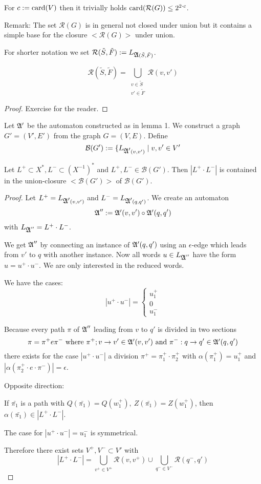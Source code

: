 For $c := \mathrm{card}(V)$ then it trivially holds $\mathrm{card}(\mathcal{R}(G)) \leq 2^{2
\cdot c}$.

Remark: The set $\mathcal{R}(G)$ is in general not closed under union but it
contains a simple base for the closure $<\mathcal{R}(G)>$ under union.

For shorter notation we set $\mathcal{R}(\tilde{S},\tilde{F}) :=
L_{\mbox{$\mathfrak{A}$}(\tilde{S},\tilde{F})}$.

\begin{lemma}
\[ \mathcal{R}(\tilde{S},\tilde{F}) = \bigcup_{\substack{v \in \tilde{S}\\v'
\in \tilde{F}}} \mathcal{R}(v, v') \]
\end{lemma}

\begin{proof}
Exercise for the reader.
\end{proof}

Let $\mbox{$\mathfrak{A'}$}$ be the automaton constructed as in lemma 1. We construct a graph
$G' = (V', E')$ from the graph $G = (V, E)$. Define
\[ \mathcal{B}(G') := \{ L_{\mbox{$\mathfrak{A'}$}(v, v')} \mid v, v' \in V' \]

\begin{lemma}
Let $L^+ \subset X^*, L^- \subset (X^{-1})^*$ and $L^+, L^- \in
\mathcal{B}(G')$. Then $|L^+ \cdot L^-|$ is contained in the union-closure
$<\mathcal{B}(G')>$ of $\mathcal{B}(G')$.
\end{lemma}

\begin{proof}
Let $L^+ = L_{\mbox{$\mathfrak{A'}$}(v, v')}$ and $L^- = L_{\mbox{$\mathfrak{A'}$}(q, q')}$. We create an
automaton
\[ \mbox{$\mathfrak{A}$}'' := \mbox{$\mathfrak{A'}$}(v, v') \circ \mbox{$\mathfrak{A'}$}(q, q') \]
with $L_{\mbox{$\mathfrak{A}$}''} = L^+ \cdot L^-$.

We get $\mbox{$\mathfrak{A}$}''$ by connecting an instance of $\mbox{$\mathfrak{A'}$}(q, q')$ using an
$\epsilon$-edge which leads from $v'$ to $q$ with another instance. Now all
words $u \in L_{\mbox{$\mathfrak{A}$}''}$ have the form $u = u^+ \cdot u^-$. We are only
interested in the reduced words.

We have the cases:
\[ |u^+ \cdot u^-| = \begin{cases} u_1^+ \\ 0 \\ u_1^- \end{cases} \]

Because every path $\pi$ of $\mbox{$\mathfrak{A}$}''$ leading from $v$ to $q'$ is divided in
two sections
\[ \pi = \pi^+ e \pi^- \text{ where }\pi^+; v \to v' \in \mbox{$\mathfrak{A'}$}(v, v') \text{
and }\pi^- : q \to q' \in \mbox{$\mathfrak{A'}$}(q, q') \]
there exists for the case $|u^+ \cdot u^-|$ a division $\pi^+ = \pi_1^+ \cdot
\pi_2^+$ with $\alpha(\pi_1^+) = u_1^+$ and $|\alpha(\pi_2^+ \cdot e \cdot
\pi^-)| = \epsilon$.

Opposite direction:

If $\bar{\pi_1}$ is a path with $Q(\bar{\pi_1}) = Q(w_1^+),\ Z(\bar{\pi_1}) =
Z(w_1^+)$, then $\alpha(\bar{\pi_1}) \in |L^+ \cdot L^-|$.

The case for $|u^+ \cdot u^-| = u_1^-$ is symmetrical.

Therefore there exist sets $V^+, V^- \subset V'$ with
\[ |L^+ \cdot L^-| = \bigcup_{v^+ \in V^+} \mathcal{R}(v, v^+) \cup
\bigcup_{q^- \in V^-} \mathcal{R}(q^-, q') \]
\end{proof}

